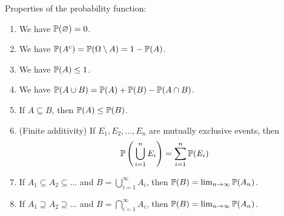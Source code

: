 \begin{proposition}
  Properties of the probability function:
  \begin{enumerate}
    \item We have $\operatorname{\mathbb{P}}(\varnothing) = 0$.
    \item We have $\operatorname{\mathbb{P}}(A^{c}) = \operatorname{\mathbb{P}}(\Omega \setminus A) = 1 - \operatorname{\mathbb{P}}(A)$.
    \item We have $\operatorname{\mathbb{P}}(A) \le 1$.
    \item We have $\operatorname{\mathbb{P}}(A \cup B) = \operatorname{\mathbb{P}}(A) + \operatorname{\mathbb{P}}(B) - \operatorname{\mathbb{P}}(A \cap B)$.
    \item If $A \subseteq B$, then $\operatorname{\mathbb{P}}(A) \le \operatorname{\mathbb{P}}(B)$.
    \item (Finite additivity) If $E_1, E_2, \dots, E_n$ are mutually exclusive events, then \[
      \operatorname{\mathbb{P}} \left(\, \bigcup_{i = 1}^{n} E_i \right) = \sum_{i = 1}^{n} \operatorname{\mathbb{P}}(E_i)\]
    \item If $A_1 \subseteq A_2 \subseteq \dots$ and $B = \bigcup_{i = 1}^{\infty} A_i$, then $\operatorname{\mathbb{P}}(B) = \lim_{n \to \infty} \operatorname{\mathbb{P}}(A_n)$.
    \item If $A_1 \supseteq A_2 \supseteq \dots$ and $B = \bigcap_{i = 1}^{\infty} A_i$, then $\operatorname{\mathbb{P}}(B) = \lim_{n \to \infty} \operatorname{\mathbb{P}}(A_n)$.
  \end{enumerate}
\end{proposition}
